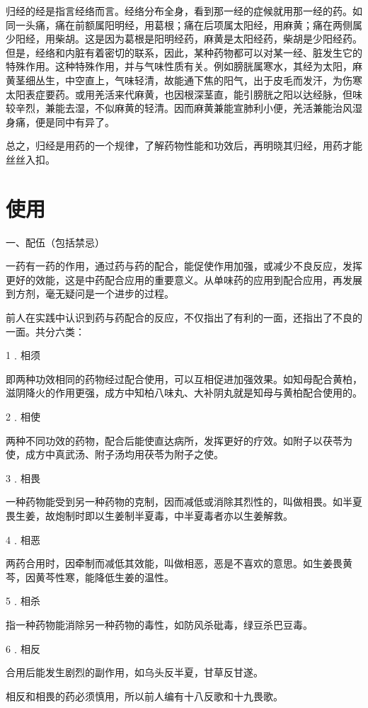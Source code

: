 \documentclass[a4paper,12pt,UTF8,twoside]{ctexbook}
\begin{document}
归经的经是指言经络而言。经络分布全身，看到那一经的症候就用那一经的药。如同一头痛，痛在前额属阳明经，用葛根；痛在后项属太阳经，用麻黄；痛在两侧属少阳经，用柴胡。这是因为葛根是阳明经药，麻黄是太阳经药，柴胡是少阳经药。但是，经络和内脏有着密切的联系，因此，某种药物都可以对某一经、脏发生它的特殊作用。这种特殊作用，并与气味性质有关。例如膀胱属寒水，其经为太阳，麻黄茎细丛生，中空直上，气味轻清，故能通下焦的阳气，出于皮毛而发汗，为伤寒太阳表症要药。或用羌活来代麻黄，也因根深茎直，能引膀胱之阳以达经脉，但味较辛烈，兼能去湿，不似麻黄的轻清。因而麻黄兼能宣肺利小便，羌活兼能治风湿身痛，便是同中有异了。

总之，归经是用药的一个规律，了解药物性能和功效后，再明晓其归经，用药才能丝丝入扣。


\section{使用}

一、配伍（包括禁忌）

一药有一药的作用，通过药与药的配合，能促使作用加强，或减少不良反应，发挥更好的效能，这是中药配合应用的重要意义。从单味药的应用到配合应用，再发展到方剂，毫无疑问是一个进步的过程。

前人在实践中认识到药与药配合的反应，不仅指出了有利的一面，还指出了不良的一面。共分六类：

1﹒相须

即两种功效相同的药物经过配合使用，可以互相促进加强效果。如知母配合黄柏，滋阴降火的作用更强，成方中知柏八味丸、大补阴丸就是知母与黄柏配合使用的。

2﹒相使

两种不同功效的药物，配合后能使直达病所，发挥更好的疗效。如附子以茯苓为使，成方中真武汤、附子汤均用茯苓为附子之使。

3﹒相畏

一种药物能受到另一种药物的克制，因而减低或消除其烈性的，叫做相畏。如半夏畏生姜，故炮制时即以生姜制半夏毒，中半夏毒者亦以生姜解救。

4﹒相恶

两药合用时，因牵制而减低其效能，叫做相恶，恶是不喜欢的意思。如生姜畏黄芩，因黄芩性寒，能降低生姜的温性。

5﹒相杀

指一种药物能消除另一种药物的毒性，如防风杀砒毒，绿豆杀巴豆毒。

6﹒相反

合用后能发生剧烈的副作用，如乌头反半夏，甘草反甘遂。

相反和相畏的药必须慎用，所以前人编有十八反歌和十九畏歌。
\end{document}
